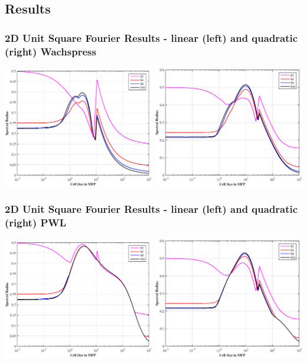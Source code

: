 \documentclass[compress,10pt]{beamer}
\begin{document}
\subsection{Results}
\begin{frame}[t]
{
\frametitle{\small 2D Unit Square Fourier Results - linear (left) and quadratic (right) Wachspress}
\vspace{1cm}
\includegraphics[width=0.495\textwidth]{images/SI_MIP_quad_C=4_UWACHSPRESS1_LS.eps}
\includegraphics[width=0.495\textwidth]{images/SI_MIP_quad_C=4_UWACHSPRESS2_LS.eps}
}
{
\frametitle{\small 2D Unit Square Fourier Results - linear (left) and quadratic (right) PWL}
\vspace{1cm}
\includegraphics[width=0.495\textwidth]{images/SI_MIP_quad_C=4_PWLD1_LS.eps}
\includegraphics[width=0.495\textwidth]{images/SI_MIP_quad_C=4_UPWLD2_LS.eps}
}
\end{frame}
\end{document}
